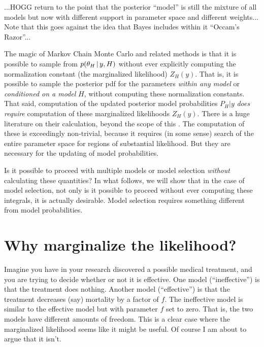 \documentclass[12pt,twoside]{article}
\begin{document}
...HOGG return to the point that the posterior ``model''
  is still the mixture of all models
  but now with different support in parameter space and different weights...
Note that this goes against the idea that Bayes includes within it ``Occam's Razor''...

The magic of Markov Chain Monte Carlo and related methods is that
  it is possible to sample from $p(\theta_H\,|\, y,H)$ without ever explicitly computing
  the normalization constant (the marginalized likelihood) $Z_H(y)$.
That is, it is possible to sample the posterior pdf for the parameters \emph{within any model}
  or \emph{conditioned on a model} $H$,
  without computing these normalization constants.
That said, computation of the updated posterior model probabilities $P_H|y$
  \emph{does require} computation of these marginalized likelihoods $Z_H(y)$.
There is a huge literature on their calculation, beyond the scope of this \documentname.
The computation of these is exceedingly non-trivial,
  because it requires (in some sense) search of the entire parameter space
  for regions of substantial likelihood.
But they are necessary
  for the updating of model probabilities.

Is it possible to proceed with multiple models or model selection
  \emph{without} calculating these quantities?
In what follows, we will show that in the case of model selection,
  not only is it possible to proceed without ever computing these integrals,
  it is actually desirable.
Model selection requires something different from model probabilities.

\section{Why marginalize the likelihood?}

Imagine you have in your research discovered a possible medical treatment,
  and you are trying to decide whether or not it is effective.
One model (``ineffective'') is that the treatment does nothing.
Another model (``effective'') is that the treatment decreases (say) mortality by a factor of $f$.
The ineffective model is similar to the effective model but with parameter $f$ set to zero.
That is, the two models have different amounts of freedom.
This is a clear case where the marginalized likelihood seems like it might be useful.
Of course I am about to argue that it isn't.
\end{document}
